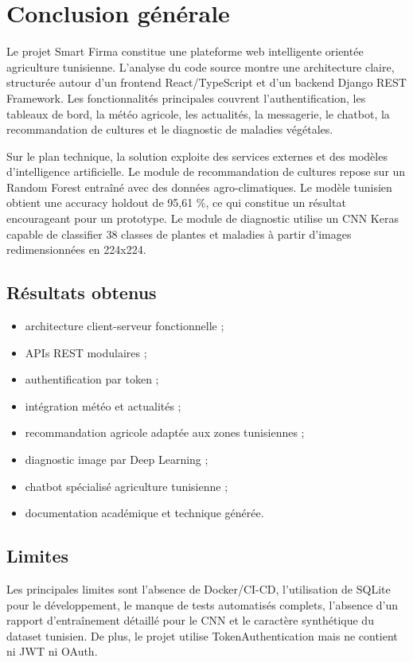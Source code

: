 \chapter{Conclusion générale}

Le projet Smart Firma constitue une plateforme web intelligente orientée agriculture tunisienne. L'analyse du code source montre une architecture claire, structurée autour d'un frontend React/TypeScript et d'un backend Django REST Framework. Les fonctionnalités principales couvrent l'authentification, les tableaux de bord, la météo agricole, les actualités, la messagerie, le chatbot, la recommandation de cultures et le diagnostic de maladies végétales.

Sur le plan technique, la solution exploite des services externes et des modèles d'intelligence artificielle. Le module de recommandation de cultures repose sur un Random Forest entraîné avec des données agro-climatiques. Le modèle tunisien obtient une accuracy holdout de 95,61 \%, ce qui constitue un résultat encourageant pour un prototype. Le module de diagnostic utilise un CNN Keras capable de classifier 38 classes de plantes et maladies à partir d'images redimensionnées en 224x224.

\section*{Résultats obtenus}
\begin{itemize}[noitemsep]
  \item architecture client-serveur fonctionnelle ;
  \item APIs REST modulaires ;
  \item authentification par token ;
  \item intégration météo et actualités ;
  \item recommandation agricole adaptée aux zones tunisiennes ;
  \item diagnostic image par Deep Learning ;
  \item chatbot spécialisé agriculture tunisienne ;
  \item documentation académique et technique générée.
\end{itemize}

\section*{Limites}
Les principales limites sont l'absence de Docker/CI-CD, l'utilisation de SQLite pour le développement, le manque de tests automatisés complets, l'absence d'un rapport d'entraînement détaillé pour le CNN et le caractère synthétique du dataset tunisien. De plus, le projet utilise TokenAuthentication mais ne contient ni JWT ni OAuth.

